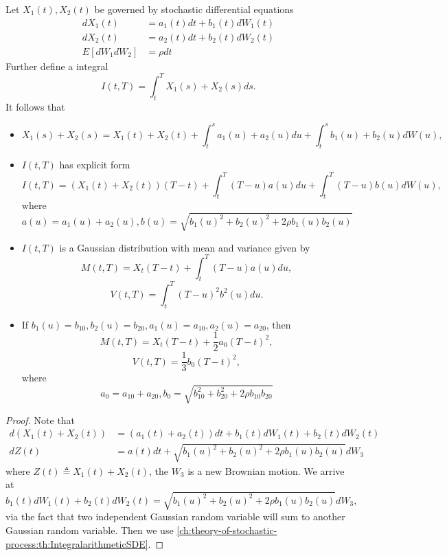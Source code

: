 \begin{refsection}
\begin{lemma}\label{ch:theory-of-stochastic-process:th:IntegralTwoarithmeticSDE} Let $X_1(t),X_2(t)$ be governed by stochastic differential equations 
	\begin{align*}
	dX_1(t) &= a_1(t)dt + b_1(t)dW_1(t) \\
	dX_2(t) &= a_2(t)dt + b_2(t)dW_2(t) \\
	E[dW_1dW_2] &= \rho dt 
	\end{align*}	
	Further define a integral $$I(t,T) = \int_t^T X_1(s) + X_2(s)ds.$$
	It follows that
	\begin{itemize}
		\item $$X_1(s) + X_2(s) =  X_1(t) + X_2(t) + \int_t^sa_1(u) + a_2(u)du + \int_t^sb_1(u)+b_2(u)dW(u),$$
		\item $I(t,T)$ has explicit form
		$$I(t,T) = (X_1(t)+X_2(t))(T-t) + \int_t^T (T-u)a(u)du + \int_t^T(T-u)b(u)dW(u),$$
		where
		$$a(u)= a_1(u) + a_2(u), b(u) = \sqrt{b_1(u)^2 + b_2(u)^2 + 2\rho b_1(u)b_2(u)}$$
		\item $I(t,T)$ is a Gaussian distribution with mean and variance given by
		$$M(t,T) = X_t(T-t) + \int_t^T (T-u)a(u)du, $$
		$$V(t,T) = \int_t^T (T-u)^2b^2(u)du. $$
		\item If $b_1(u) = b_{10},b_2(u) = b_{20}, a_1(u) = a_{10},a_2(u) = a_{20}$, then
		$$M(t,T) = X_t(T-t) + \frac{1}{2}a_0(T-t)^2, $$
		$$V(t,T) = \frac{1}{3}b_0 (T-t)^2, $$
		where
		$$a_0= a_{10} + a_{20}, b_0 = \sqrt{b_{10}^2 + b_{20}^2 + 2\rho b_{10}b_{20}}$$
	\end{itemize}	
\end{lemma}
\begin{proof}
	
	Note that
	\begin{align*}
	d(X_1(t)+X_2(t)) &= (a_1(t)+a_2(t))dt + b_1(t)dW_1(t)+b_2(t)dW_2(t) \\
	dZ(t) &= a(t)dt + \sqrt{b_1(u)^2 + b_2(u)^2 + 2\rho b_1(u)b_2(u)}dW_3
	\end{align*}
	where $Z(t)\triangleq X_1(t) + X_2(t)$, the $W_3$ is a new Brownian motion. We arrive at
	$$b_1(t)dW_1(t)+b_2(t)dW_2(t) = \sqrt{b_1(u)^2 + b_2(u)^2 + 2\rho b_1(u)b_2(u)} dW_3,$$
	via the fact that two independent Gaussian random variable will sum to another Gaussian random variable.
	Then we use \autoref{ch:theory-of-stochastic-process:th:IntegralarithmeticSDE}.	
\end{proof}


\end{refsection}
